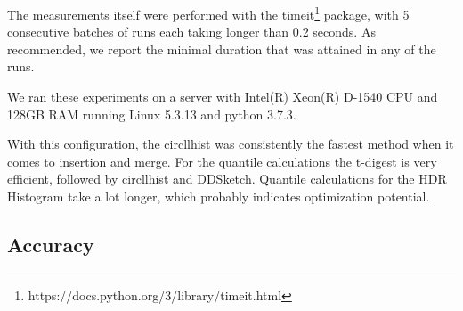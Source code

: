 \documentclass{article}
\theoremstyle{plain}
\theoremstyle{remark}
\begin{document}
The measurements itself were performed with the
timeit\footnote{https://docs.python.org/3/library/timeit.html} package, with 5 consecutive batches
of runs each taking longer than 0.2 seconds.  As recommended, we report the minimal duration that
was attained in any of the runs.

We ran these experiments on a server with Intel(R) Xeon(R) D-1540 CPU and 128GB RAM running
Linux 5.3.13 and python 3.7.3.

With this configuration, the circllhist was consistently the fastest method when it comes to
insertion and merge.  For the quantile calculations the t-digest is very efficient, followed by
circllhist and DDSketch. Quantile calculations for the HDR Histogram take a lot longer, which
probably indicates optimization potential.

\subsection{Accuracy}
\end{document}
